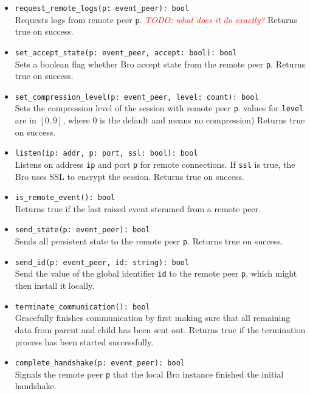 \documentclass[10pt,landscape]{article}
\def\todo#1{\textit{\textcolor{red}{TODO: #1}}}
\newcommand{\ReturnsTrueOnSuccess}{Returns true on success.\xspace}
\begin{document}
\begin{multicols*}{2}
\begin{itemize}
    Requests synchronization of IDs with remote peer \verb|p|. If \verb|auth|
    is true, the local Bro instance considers its current state authoritative
    and sends it to \verb|p| right after the handshake.
  \item \verb|request_remote_logs(p: event_peer): bool|\\
    Requests logs from remote peer \verb|p|. \todo{what does it do exactly?}
    \ReturnsTrueOnSuccess
  \item \verb|set_accept_state(p: event_peer, accept: bool): bool|\\
    Sets a boolean flag whether Bro accept state from the remote peer \verb|p|.
    \ReturnsTrueOnSuccess
  \item \verb|set_compression_level(p: event_peer, level: count): bool|\\
    Sets the compression level of the session with remote peer \verb|p|.
    values for \verb|level| are in $[0,9]$, where 0 is the default and means no
    compression)
    \ReturnsTrueOnSuccess
  \item \verb|listen(ip: addr, p: port, ssl: bool): bool|\\
    Listens on address \verb|ip| and port \verb|p| for remote connections. If
    \verb|ssl| is true, the Bro uses SSL to encrypt the session.
    \ReturnsTrueOnSuccess
  \item \verb|is_remote_event(): bool|\\
    Returns true if the last raised event stemmed from a remote peer.
  \item \verb|send_state(p: event_peer): bool|\\
    Sends all persistent state to the remote peer \verb|p|.
    \ReturnsTrueOnSuccess
  \item \verb|send_id(p: event_peer, id: string): bool|\\
    Send the value of the global identifier \verb|id| to the remote peer
    \verb|p|, which might then install it locally.
  \item \verb|terminate_communication(): bool|\\
    Gracefully finishes communication by first making sure that all remaining
    data from parent and child has been sent out.
    Returns true if the termination process has been started successfully.
  \item \verb|complete_handshake(p: event_peer): bool|\\
    Signals the remote peer \verb|p| that the local Bro instance finished the
    initial handshake.

\end{itemize}
\end{multicols*}
\end{document}
